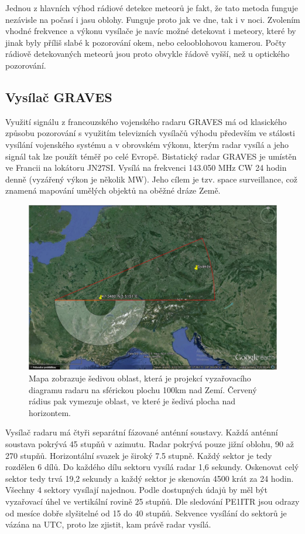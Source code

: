 \documentclass[12pt,a4paper,oneside]{article}
\begin{document}
Jednou z hlavních výhod rádiové detekce meteorů je fakt, že tato metoda funguje nezávisle na počasí i jasu oblohy. Funguje proto jak ve dne, tak i v noci. Zvolením vhodné frekvence a výkonu vysílače je navíc možné detekovat i meteory, které by jinak byly příliš slabé k pozorování okem, nebo celooblohovou kamerou. Počty rádiově detekovaných meteorů jsou proto obvykle řádově vyšší, než u optického pozorování. 

\subsection{Vysílač GRAVES}

Využití signálu z francouzského vojenského radaru GRAVES má od klasického způsobu pozorování s využitím televizních vysílačů výhodu především ve stálosti vysílání vojenského systému a v obrovském výkonu, kterým radar vysílá a jeho signál tak lze použít téměř po celé Evropě. 
Bistatický radar GRAVES je umístěn ve Francii na lokátoru JN27SI. Vysílá na frekvenci 143.050 MHz CW 24 hodin denně (vyzářený výkon je několik MW). Jeho cílem je tzv. space surveillance, což znamená mapování umělých objektů na oběžné dráze Země. 

\begin{figure} [htbp]
\centering
\includegraphics [width=120mm] {./img/graves_range.jpg} 
\caption{Mapa zobrazuje šedivou oblast, která je projekcí vyzařovacího diagramu radaru na sférickou plochu 100km nad Zemí. Červený rádius pak vymezuje oblast, ve které je šedivá plocha nad horizontem.}
\end{figure}

Vysílač radaru má čtyři separátní fázované anténní soustavy. Každá anténní soustava pokrývá 45 stupňů v azimutu. Radar pokrývá pouze jižní oblohu, 90 až 270 stupňů. Horizontální svazek je široký 7.5 stupně. Každý sektor je tedy rozdělen 6 dílů. Do každého dílu sektoru vysílá radar 1,6 sekundy. Oskenovat celý sektor tedy trvá 19,2 sekundy a každý sektor je skenován 4500 krát za 24 hodin. Všechny 4 sektory vysílají najednou. Podle dostupných údajů \cite{GRAVES_book} by měl být vyzařovací úhel ve vertikální rovině 25 stupňů. Dle sledování PE1ITR jsou odrazy od mesíce dobře slyšitelné od 15 do 40 stupňů. Sekvence vysílání do sektorů je vázána na UTC, proto lze zjistit, kam právě radar vysílá.
\end{document}
